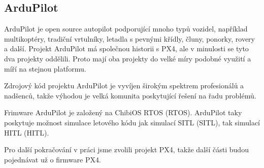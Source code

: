 \subsection{ArduPilot}

ArduPilot je open source autopilot podporující mnoho typů vozidel, například multikoptéry, tradiční vrtulníky, letadla s pevnými křídly, čluny, ponorky, rovery a další. Projekt ArduPilot má společnou historii s PX4, ale v minulosti se tyto dva projekty oddělili. Proto mají oba projekty do velké míry podobné využití a míří na stejnou platformu.

Zdrojový kód projektu ArduPilot je vyvíjen širokým spektrem profesionálů a nadšenců, takže výhodou je velká komunita poskytující řešení na řadu problémů.

Frimware ArduPilot je založený na ChibiOS \acs{RTOS} (\acl{RTOS}). ArduPilot taky poskytuje možnost simulace letového kódu jak simulací \acs{SITL} (\acl{SITL}), tak simulací \acs{HITL} (\acl{HITL}). \cite{ARDU}

Pro další pokračování v práci jsme zvolili projekt PX4, takže další části budou pojednávat už o firmware PX4.
